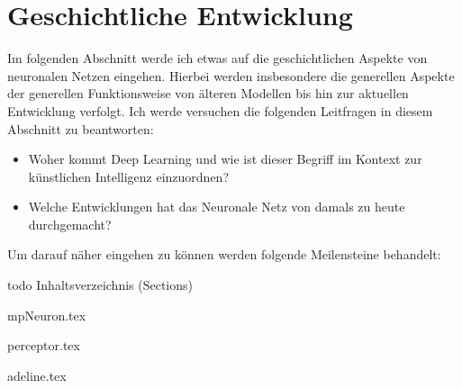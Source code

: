 \part{Geschichtliche Entwicklung}

Im folgenden Abschnitt werde ich etwas auf die geschichtlichen Aspekte von neuronalen Netzen eingehen. Hierbei werden insbesondere die generellen Aspekte der generellen Funktionsweise von älteren Modellen bis hin zur aktuellen Entwicklung verfolgt. Ich werde versuchen die folgenden Leitfragen in diesem Abschnitt zu beantworten: 

\begin{itemize}
\item Woher kommt Deep Learning und wie ist dieser Begriff im Kontext zur künstlichen Intelligenz einzuordnen?
\item Welche Entwicklungen hat das Neuronale Netz von damals zu heute durchgemacht?
\end{itemize}

Um darauf näher eingehen zu können werden folgende Meilensteine behandelt: 

todo Inhaltsverzeichnis (Sections)

{mpNeuron.tex}
\FloatBarrier

{perceptor.tex}
\FloatBarrier

{adeline.tex}
